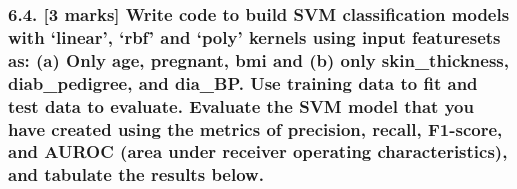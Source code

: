 \documentclass[11pt]{article}
\begin{document}
    \hypertarget{marks-write-code-to-build-svm-classification-models-with-linear-rbf-and-poly-kernels-using-input-featuresets-as-a-only-age-pregnant-bmi-and-b-only-skin_thickness-diab_pedigree-and-dia_bp.-use-training-data-to-fit-and-test-data-to-evaluate.-evaluate-the-svm-model-that-you-have-created-using-the-metrics-of-precision-recall-f1-score-and-auroc-area-under-receiver-operating-characteristics-and-tabulate-the-results-below.}{%
\subsubsection{6.4. {[}3 marks{]} Write code to build SVM classification
models with `linear', `rbf' and `poly' kernels using input featuresets
as: (a) Only age, pregnant, bmi and (b) only skin\_thickness,
diab\_pedigree, and dia\_BP. Use training data to fit and test data to
evaluate. Evaluate the SVM model that you have created using the metrics
of precision, recall, F1-score, and AUROC (area under receiver operating
characteristics), and tabulate the results
below.}\label{marks-write-code-to-build-svm-classification-models-with-linear-rbf-and-poly-kernels-using-input-featuresets-as-a-only-age-pregnant-bmi-and-b-only-skin_thickness-diab_pedigree-and-dia_bp.-use-training-data-to-fit-and-test-data-to-evaluate.-evaluate-the-svm-model-that-you-have-created-using-the-metrics-of-precision-recall-f1-score-and-auroc-area-under-receiver-operating-characteristics-and-tabulate-the-results-below.}}
\end{document}
